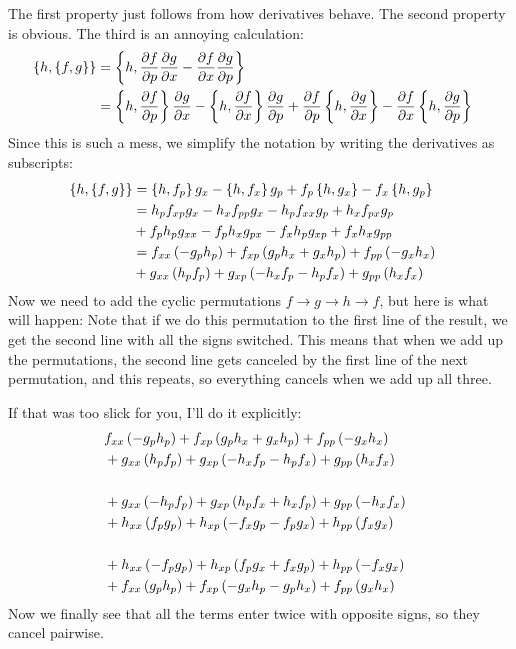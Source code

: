 \documentclass[
  letterpaper,
  DIV=11,
  numbers=noendperiod]{scrartcl}
\begin{document}
The first property just follows from how derivatives behave. The second
property is obvious. The third is an annoying calculation: \begin{align}
\{h,\{f,g\}\}&=
\left\{h, \frac{\partial f}{\partial p}\frac{\partial g}{\partial x} - \frac{\partial f}{\partial x}\frac{\partial g}{\partial p} \right\}\cr
&=\left\{h, \frac{\partial f}{\partial p}\right\}\frac{\partial g}{\partial x} - \left\{ h, \frac{\partial f}{\partial x}\right\}\frac{\partial g}{\partial p}
+\frac{\partial f}{\partial p}\left\{h, \frac{\partial g}{\partial x}\right\} - \frac{\partial f}{\partial x}\left\{ h, \frac{\partial g}{\partial p} \right\}
\end{align} Since this is such a mess, we simplify the notation by
writing the derivatives as subscripts: \begin{align}
\{h,\{f,g\}\}&=\left\{h, f_p\right\}g_x- \left\{ h, f_x\right\}g_p +f_p\left\{h, g_x\right\} - f_x\left\{ h, g_p \right\}\cr
&=
h_p f_{xp}g_x - h_xf_{pp}g_x - h_p f_{xx}g_p+h_x f_{px}g_p\cr
&+f_p h_p g_{xx} - f_p h_x g_{px} - f_x h_p g_{xp}+f_x h_xg_{pp}\cr
&=
f_{xx}\left(- g_p h_p \right)
+f_{xp}\left(g_ph_x +  g_x h_p\right)
+f_{pp}\left(- g_x h_x\right)\cr
&+g_{xx}\left(h_p f_p \right)  
+g_{xp}\left( - h_x f_p  - h_pf_x \right)
+g_{pp}\left(h_xf_x \right)
\end{align} Now we need to add the cyclic permutations
\(f\to g\to h\to f\), but here is what will happen: Note that if we do
this permutation to the first line of the result, we get the second line
with all the signs switched. This means that when we add up the
permutations, the second line gets canceled by the first line of the
next permutation, and this repeats, so everything cancels when we add up
all three.

If that was too slick for you, I'll do it explicitly: \begin{align}
&f_{xx}\left(- g_p h_p \right)
+f_{xp}\left(g_ph_x +  g_x h_p\right)
+f_{pp}\left(- g_x h_x\right)\cr
&+g_{xx}\left(h_p f_p \right)  
+g_{xp}\left( - h_x f_p  - h_pf_x \right)
+g_{pp}\left(h_xf_x \right)\cr~\cr
&+g_{xx}\left(- h_p f_p \right)
+g_{xp}\left(h_pf_x +  h_x f_p\right)
+g_{pp}\left(- h_x f_x\right)\cr
&+h_{xx}\left(f_p g_p \right)  
+h_{xp}\left( - f_x g_p  - f_pg_x \right)
+h_{pp}\left(f_xg_x \right)\cr~\cr
&+h_{xx}\left(- f_p g_p \right)
+h_{xp}\left(f_pg_x +  f_x g_p\right)
+h_{pp}\left(- f_x g_x\right)\cr
&+f_{xx}\left(g_p h_p \right)  
+f_{xp}\left( - g_x h_p  - g_p h_x \right)
+f_{pp}\left(g_xh_x \right)
\end{align} Now we finally see that all the terms enter twice with
opposite signs, so they cancel pairwise.
\end{document}
